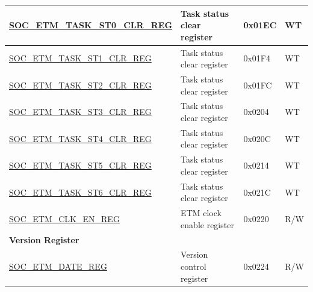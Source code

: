 \begin{longtable}{ | p{6cm} | p{6.4cm} | p{1.3cm} | p{1.8cm} | }
\hyperref[regdesc:SOCETMTASKST0CLRREG]{SOC\_ETM\_TASK\_ST0\_CLR\_REG} & Task status clear register & 0x01EC & WT \\ \hline
\hyperref[regdesc:SOCETMTASKST1CLRREG]{SOC\_ETM\_TASK\_ST1\_CLR\_REG} & Task status clear register & 0x01F4 & WT \\ \hline
\hyperref[regdesc:SOCETMTASKST2CLRREG]{SOC\_ETM\_TASK\_ST2\_CLR\_REG} & Task status clear register & 0x01FC & WT \\ \hline
\hyperref[regdesc:SOCETMTASKST3CLRREG]{SOC\_ETM\_TASK\_ST3\_CLR\_REG} & Task status clear register & 0x0204 & WT \\ \hline
\hyperref[regdesc:SOCETMTASKST4CLRREG]{SOC\_ETM\_TASK\_ST4\_CLR\_REG} & Task status clear register & 0x020C & WT \\ \hline
\hyperref[regdesc:SOCETMTASKST5CLRREG]{SOC\_ETM\_TASK\_ST5\_CLR\_REG} & Task status clear register & 0x0214 & WT \\ \hline
\hyperref[regdesc:SOCETMTASKST6CLRREG]{SOC\_ETM\_TASK\_ST6\_CLR\_REG} & Task status clear register & 0x021C & WT \\ \hline
\hyperref[regdesc:SOCETMCLKENREG]{SOC\_ETM\_CLK\_EN\_REG} & ETM clock enable register & 0x0220 & R/W \\ \hline
\multicolumn{4}{|l|}{\textbf{Version Register}} \\ \hline
\hyperref[regdesc:SOCETMDATEREG]{SOC\_ETM\_DATE\_REG} & Version control register & 0x0224 & R/W \\ \hline
\end{longtable}
